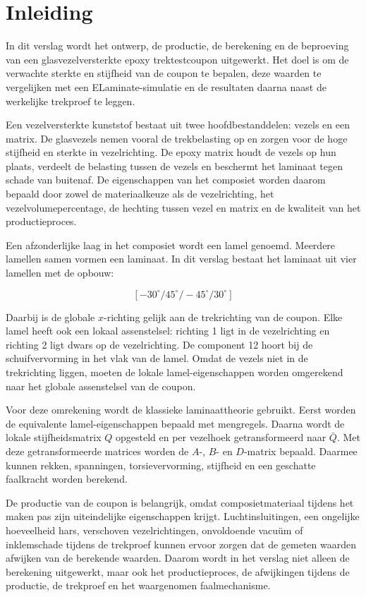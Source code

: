 \chapter{Inleiding}

In dit verslag wordt het ontwerp, de productie, de berekening en de beproeving
van een glasvezelversterkte epoxy trektestcoupon uitgewerkt. Het doel is om de
verwachte sterkte en stijfheid van de coupon te bepalen, deze waarden te
vergelijken met een ELaminate-simulatie en de resultaten daarna naast de
werkelijke trekproef te leggen.

Een vezelversterkte kunststof bestaat uit twee hoofdbestanddelen: vezels en een
matrix. De glasvezels nemen vooral de trekbelasting op en zorgen voor de hoge
stijfheid en sterkte in vezelrichting. De epoxy matrix houdt de vezels op hun
plaats, verdeelt de belasting tussen de vezels en beschermt het laminaat tegen
schade van buitenaf. De eigenschappen van het composiet worden daarom bepaald
door zowel de materiaalkeuze als de vezelrichting, het vezelvolumepercentage,
de hechting tussen vezel en matrix en de kwaliteit van het productieproces.

Een afzonderlijke laag in het composiet wordt een lamel genoemd. Meerdere
lamellen samen vormen een laminaat. In dit verslag bestaat het laminaat uit vier
lamellen met de opbouw:

\[
[-30^\circ / 45^\circ / -45^\circ / 30^\circ]
\]

Daarbij is de globale \(x\)-richting gelijk aan de trekrichting van de coupon.
Elke lamel heeft ook een lokaal assenstelsel: richting 1 ligt in de
vezelrichting en richting 2 ligt dwars op de vezelrichting. De component 12
hoort bij de schuifvervorming in het vlak van de lamel. Omdat de vezels niet in de
trekrichting liggen, moeten de lokale lamel-eigenschappen worden omgerekend
naar het globale assenstelsel van de coupon.

Voor deze omrekening wordt de klassieke laminaattheorie gebruikt. Eerst worden
de equivalente lamel-eigenschappen bepaald met mengregels. Daarna wordt de
lokale stijfheidsmatrix \(Q\) opgesteld en per vezelhoek getransformeerd naar
\(\bar{Q}\). Met deze getransformeerde matrices worden de \(A\)-, \(B\)- en
\(D\)-matrix bepaald. Daarmee kunnen rekken, spanningen, torsievervorming,
stijfheid en een geschatte faalkracht worden berekend.

De productie van de coupon is belangrijk, omdat composietmateriaal tijdens het
maken pas zijn uiteindelijke eigenschappen krijgt. Luchtinsluitingen, een
ongelijke hoeveelheid hars, verschoven vezelrichtingen, onvoldoende vacuüm of
inklemschade tijdens de trekproef kunnen ervoor zorgen dat de gemeten waarden
afwijken van de berekende waarden. Daarom wordt in het verslag niet alleen de
berekening uitgewerkt, maar ook het productieproces, de afwijkingen tijdens de
productie, de trekproef en het waargenomen faalmechanisme.

